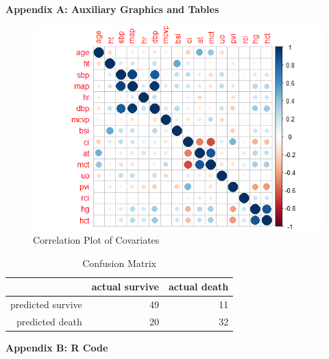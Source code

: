 \documentclass{article}\usepackage[]{graphicx}\usepackage[]{color}
\begin{document}
\newpage
\noindent \Large{{\bf Appendix A: Auxiliary Graphics and Tables}}
\begin{figure}
\centering
\label{cor}
\caption{Correlation Plot of Covariates}
\includegraphics{cor.png}
\end{figure}

\begin{table}[ht]
\centering
\label{confuse}
\caption{Confusion Matrix}
\begin{tabular}{rrr}
  \hline
 & actual survive & actual death \\ 
  \hline
predicted survive &  49 &  11 \\ 
  predicted death &  20 &  32 \\ 
   \hline
\end{tabular}
\end{table}
\newpage
\noindent \Large{{\bf Appendix B: R Code}}

\end{document}
